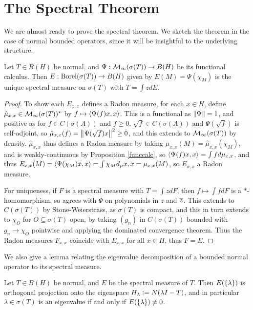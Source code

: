 \documentclass[10pt]{amsart}
\begin{document}
\section{The Spectral Theorem}
We are almost ready to prove the spectral theorem. We sketch the theorem in the case of normal bounded operators, since it will be insightful to the underlying structure.
\begin{theorem}\label{specnorm}
    Let $T \in B(H)$ be normal, and $\Psi : \mathcal{M}_\infty(\sigma(T)) \to B(H)$ be its functional calculus. Then $E : \operatorname{Borel}(\sigma(T)) \to B(H)$ given by $E(M) = \Psi(\chi_M)$ is the unique spectral measure on $\sigma(T)$ with $T = \int z dE$.
\end{theorem}
\begin{proof}
    To show each $E_{x, x}$ defines a Radon measure, for each $x \in H$, define $\hat\mu_{x, x} \in \mathcal{M}_\infty(\sigma(T))^*$ by $f \mapsto \left\langle \Psi(f)x, x \right\rangle$. This is a functional as $\left\| \Psi \right\| = 1$, and positive as for $f \in C(\sigma(A))$ and $f \geq 0$, $\sqrt{f} \in C(\sigma(A))$ and $\Psi(\sqrt{f})$ is self-adjoint, so $\hat\mu_{x, x}(f) = \left\| \Psi(\sqrt{f})x \right\|^2 \geq 0$, and this extends to $\mathcal{M}_\infty(\sigma(T))$ by density. $\hat\mu_{x, x}$ thus defines a Radon measure by taking $\mu_{x, x}(M) = \hat\mu_{x, x}(\chi_M)$, and is weakly-continuous by Proposition \ref{funccalc}, so $\left\langle \Psi(f)x, x \right\rangle = \int f d\mu_{x, x}$, and thus $E_{x, x}(M) = \left\langle \Psi(\chi_M)x, x \right\rangle = \int \chi_M d_\mu{x, x} = \mu_{x, x}(M)$, so $E_{x, x}$ a Radon measure.

    For uniqueness, if $F$ is a spectral measure with $T = \int z dF$, then $f \mapsto \int f dF$ is a $*$-homomorphism, so agrees with $\Psi$ on polynomials in $z$ and $\overline{z}$. This extends to $C(\sigma(T))$ by Stone-Weierstrass, as $\sigma(T)$ is compact, and this in turn extends to $\chi_O$ for $O \subseteq \sigma(T)$ open, by taking $(g_n)$ in $C(\sigma(T))$ bounded with $g_n \to \chi_O$ pointwise and applying the dominated convergence theorem. Thus the Radon measures $F_{x, x}$ coincide with $E_{x, x}$ for all $x \in H$, thus $F = E$.
\end{proof}
We also give a lemma relating the eigenvalue decomposition of a bounded normal operator to its spectral measure.
\begin{lemma}\label{bdnormaleigen}
    Let $T \in B(H)$ be normal, and $E$ be the spectral measure of $T$. Then $E(\left\{  \lambda  \right\})$ is orthogonal projection onto the eigenspace $H_\lambda \vcentcolon= N(\lambda I - T)$, and in particular $\lambda \in \sigma(T)$ is an eigenvalue if and only if $E(\left\{  \lambda  \right\}) \neq 0$.
\end{lemma}
\end{document}
